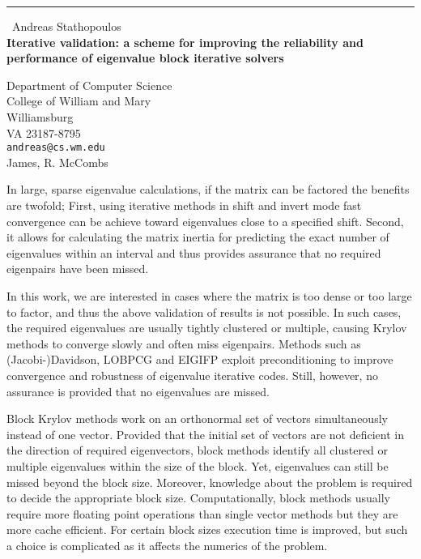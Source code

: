 \documentclass{report}
\begin{document}
\begin{center}
\rule{6in}{1pt} \
{\large Andreas Stathopoulos \\
{\bf Iterative validation: a scheme for improving the reliability and performance of eigenvalue block iterative solvers}}

Department of Computer Science  \\           College of William and Mary \\ Williamsburg \\ VA 23187-8795
\\
{\tt andreas@cs.wm.edu}\\
James, R. McCombs\end{center}

In large, sparse eigenvalue calculations,
if the matrix can be factored the benefits are twofold;
First, using iterative methods in shift and invert mode fast
convergence can be achieve toward eigenvalues close to a specified shift.
Second, it allows for calculating the matrix inertia
for predicting the exact number of eigenvalues within an interval
and thus provides assurance that no required eigenpairs have been missed.

In this work, we are interested in cases where the matrix is too dense
or too large to factor, and thus the above validation of results is
not possible.
In such cases, the required eigenvalues are usually
tightly clustered or multiple, causing Krylov methods to converge
slowly and often miss eigenpairs.
Methods such as (Jacobi-)Davidson, LOBPCG and EIGIFP
exploit preconditioning to improve convergence and robustness of
eigenvalue iterative codes.
Still, however, no assurance is provided that no eigenvalues are missed.

Block Krylov methods work on an orthonormal set of vectors simultaneously
instead of one vector.
Provided that the initial set of vectors are not deficient in the direction
of required eigenvectors, block methods identify all clustered or
multiple eigenvalues within the size of the block.
Yet, eigenvalues can still be missed beyond the block size.
Moreover, knowledge about the problem is required to decide the
appropriate block size.
Computationally, block methods usually require more floating point
operations than single vector methods but they are more cache efficient.
For certain block sizes execution time is improved, but such
a choice is complicated as it affects the numerics of the problem.
\end{document}
